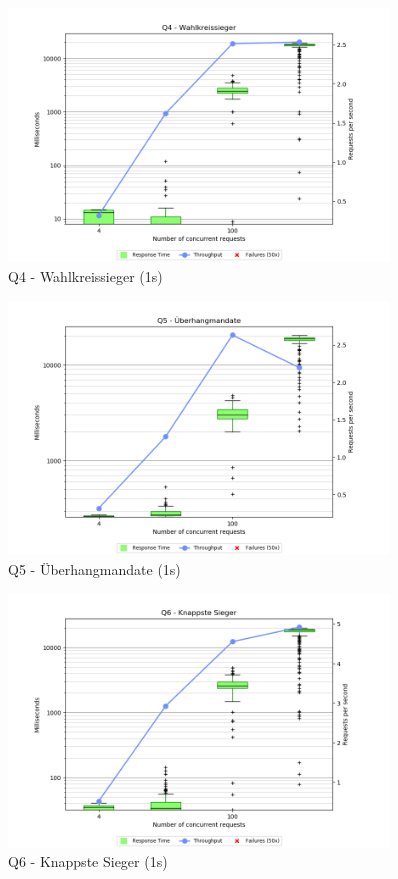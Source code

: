 \documentclass[a4paper]{scrreprt}
\begin{document}
\begin{figure}[htb!]
	\centering
	\includegraphics[width=0.9\textwidth]{images/plots_1s/Q4}
	\caption {Q4 - Wahlkreissieger (1s)}
\end{figure}

\begin{figure}[htb!]
	\centering
	\includegraphics[width=0.9\textwidth]{images/plots_1s/Q5}
	\caption {Q5 - Überhangmandate (1s)}
\end{figure}

\begin{figure}[htb!]
	\centering
	\includegraphics[width=0.9\textwidth]{images/plots_1s/Q6}
	\caption {Q6 - Knappste Sieger (1s)}
\end{figure}
\end{document}
